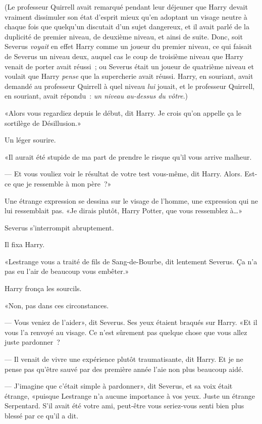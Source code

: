 (Le professeur Quirrell avait remarqué pendant leur déjeuner que Harry devait vraiment dissimuler son état d'esprit mieux qu'en adoptant un visage neutre à chaque fois que quelqu'un discutait d'un sujet dangereux, et il avait parlé de la duplicité de premier niveau, de deuxième niveau, et ainsi de suite. Donc, soit Severus \emph{voyait} en effet Harry comme un joueur du premier niveau, ce qui faisait de Severus un niveau deux, auquel cas le coup de troisième niveau que Harry venait de porter avait réussi~; ou Severus était un joueur de quatrième niveau et voulait que Harry \emph{pense} que la supercherie avait réussi. Harry, en souriant, avait demandé au professeur Quirrell à quel niveau \emph{lui} jouait, et le professeur Quirrell, en souriant, avait répondu~: \emph{un niveau au-dessus du vôtre}.)

«Alors vous regardiez depuis le début, dit Harry. Je crois qu'on appelle ça le sortilège de Désillusion.»

Un léger sourire.

«Il aurait été stupide de ma part de prendre le risque qu'il vous arrive malheur.

--- Et vous vouliez voir le résultat de votre test vous-même, dit Harry. Alors. Est-ce que je ressemble à mon père~?»

Une étrange expression se dessina sur le visage de l'homme, une expression qui ne lui ressemblait pas. «Je dirais plutôt, Harry Potter, que vous ressemblez à…»

Severus s'interrompit abruptement.

Il fixa Harry.

«Lestrange vous a traité de fils de Sang-de-Bourbe, dit lentement Severus. Ça n'a pas eu l'air de beaucoup vous embêter.»

Harry fronça les sourcils.

«Non, pas dans ces circonstances.

--- Vous veniez de l'aider», dit Severus. Ses yeux étaient braqués sur Harry. «Et il vous l'a renvoyé au visage. Ce n'est sûrement pas quelque chose que vous allez juste pardonner~?

--- Il venait de vivre une expérience plutôt traumatisante, dit Harry. Et je ne pense pas qu'être sauvé par des première année l'aie non plus beaucoup aidé.

--- J'imagine que c'était simple à pardonner», dit Severus, et sa voix était étrange, «puisque Lestrange n'a aucune importance à vos yeux. Juste un étrange Serpentard. S'il avait été votre ami, peut-être vous seriez-vous senti bien plus blessé par ce qu'il a dit.

